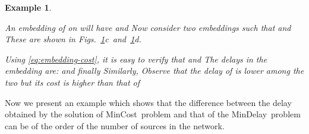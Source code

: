 \documentclass[journal]{IEEEtran}
\newtheorem{example}{{\bf Example}}
\newcommand{\mincost}{\textsf{MinCost}}
\newcommand{\mindelay}{\textsf{MinDelay}}
\begin{document}
\begin{example}
\begin{figure}[tbp]
    \label{fig:sysmodel}
  \end{figure}
  An embedding  of  on  will have
   and
   Now consider two embeddings
   such that  and
   These are shown in
  Figs.~\ref{fig:sysmodel}c~and~\ref{fig:sysmodel}d.

  Using \eqref{eq:embedding-cost}, it is easy to verify that
   and  The delays in the
  embedding  are:  and finally
   Similarly,
   Observe that the delay of  is
  lower among the two but its cost is higher than that of
   
\end{example}


Now we present an example which shows that the difference between the
delay obtained by the solution of \mincost\ problem and that of the
\mindelay\ problem can be of the order of the number of sources in the
network.
\end{document}
